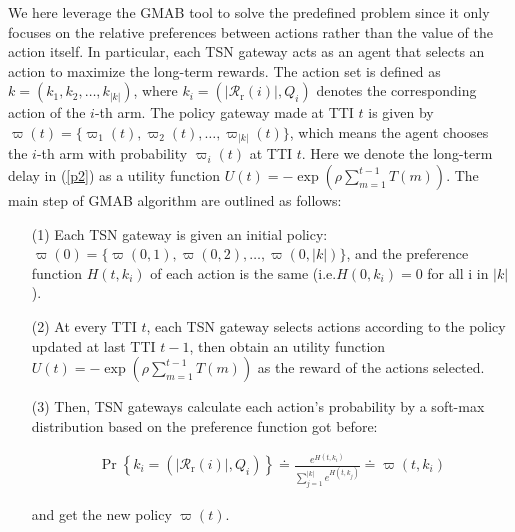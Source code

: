 \documentclass{SCIS2021}
\begin{document}
	\par We here leverage the GMAB tool to solve the predefined problem since it only focuses on the relative preferences between actions rather than the value of the action itself. In particular, each TSN gateway acts as an agent that selects an action to maximize the long-term rewards. The action set is defined as $k=\left(k_{1}, k_{2}, \ldots, k_{\left|k\right|}\right)$, where $k_{i}=\left(\left|\mathcal{R}_{\mathrm{r}}(i)\right|, Q_{i}\right)$ denotes the corresponding action of the $i$-th arm. The policy gateway made at TTI $t$ is given by $\varpi(t)=\{\varpi_{1}(t), \varpi_{2}(t), \ldots, \varpi_{\left|k\right|}(t)\}$, which means the agent chooses the $i$-th arm with probability $\varpi_{i}(t)$ at TTI $t$. Here we denote the long-term delay in (\ref{p2}) as a utility function $U(t) =-\exp (\rho \sum_{m=1}^{t-1} T(m))$. The main step of GMAB algorithm are outlined as follows:


	\begin{itemize}[itemsep= 15 pt,topsep = -1.5 pt]
		\item[(1)]
		Each TSN gateway is given an initial policy: $\varpi(0)=\{\varpi(0,1), \varpi(0,2), \ldots, \varpi(0,\left|k\right|)\}$, and the preference function $H(t,k_{i})$ of each action is the same (i.e.$H(0,k_{i})=0$ for all i in $|k|$).
	\end{itemize}

	\begin{itemize}[itemsep= 15 pt,topsep = -1.5 pt]
		\item[(2)]
		At every TTI $t$, each TSN gateway selects actions according to the policy updated at last TTI $t-1$, then obtain an utility function $U(t) =-\exp (\rho \sum_{m=1}^{t-1} T(m))$ as the reward of the actions selected.
	\end{itemize}

	\begin{itemize}[itemsep= 15 pt,topsep = -1.5 pt]
		\item[(3)]
		Then, TSN gateways calculate each action's probability by a soft-max distribution based on the preference function got before:\\
		\setlength\abovedisplayskip{-20pt}
		\begin{center}
			\begin{equation}
				\begin{aligned}
					\operatorname{Pr}\left\{k_{i}=\left(\left|\mathcal{R}_{\mathrm{r}}(i)\right|, Q_{i}\right)\right\} \doteq \frac{e^{H(t,k_{i})}}{\sum_{j=1}^{\left|k\right|} e^{H(t,k_{j})}} \doteq \varpi(t,k_{i})
				\end{aligned}
			\end{equation}
		\end{center}
		\setlength\belowdisplayskip{-15pt}
		\vspace{-6pt}
		and get the new policy  $\varpi(t)$.
	\end{itemize}
\end{document}
